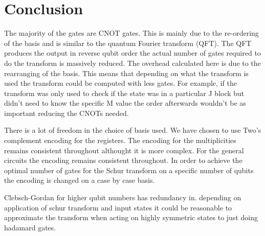 \documentclass[12pt]{article}
\begin{document}
\section{Conclusion}

The majority of the gates are CNOT gates. This is mainly due to the re-ordering of the basis and is similar to the quantum Fourier transform (QFT). The QFT produces the output in reverse qubit order the actual number of gates required to do the transform is massively reduced. The overhead calculated here is due to the rearranging of the basis. This means that depending on what the transform is used the transform could be computed with less gates. For example, if the transform was only used to check if the state was in a particular J block but didn't need to know the specific M value the order afterwards wouldn't be as important reducing the CNOTs needed.

There is a lot of freedom in the choice of basis used. We have chosen to use Two's complement encoding for the registers. The encoding for the multiplicities remains consistent throughout althought it is more complex. For the general circuits the encoding remains consistent throughout. In order to achieve the optimal number of gates for the Schur transform on a specific number of qubits the encoding is changed on a case by case basis. 

Clebsch-Gordan for higher qubit numbers has redundancy in. depending on application of schur transform and input states it could be reasonable to approximate the transform when acting on highly symmetric states to just doing hadamard gates.





\newpage

\begin{landscape}

\end{landscape}

\end{document}

